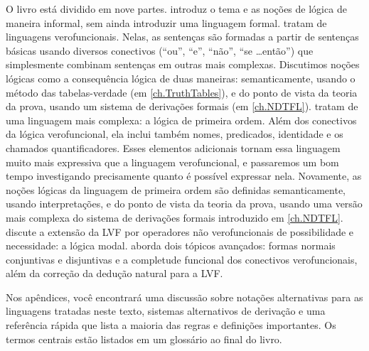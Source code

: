 O livro está dividido em nove partes.  introduz o tema e as noções de lógica de maneira informal, sem ainda introduzir uma linguagem formal.  tratam de linguagens verofuncionais. Nelas, as sentenças são formadas a partir de sentenças básicas usando diversos conectivos (\textquotedblleft ou\textquotedblright, \textquotedblleft e\textquotedblright, \textquotedblleft não\textquotedblright, \textquotedblleft se \dots então\textquotedblright) que simplesmente combinam sentenças em outras mais complexas. Discutimos noções lógicas como a consequência lógica de duas maneiras: semanticamente, usando o método das tabelas-verdade (em \cref{ch.TruthTables}), e do ponto de vista da teoria da prova, usando um sistema de derivações formais (em \cref{ch.NDTFL}).  tratam de uma linguagem mais complexa: a lógica de primeira ordem. Além dos conectivos da lógica verofuncional, ela inclui também nomes, predicados, identidade e os chamados quantificadores. Esses elementos adicionais tornam essa linguagem muito mais expressiva que a linguagem verofuncional, e passaremos um bom tempo investigando precisamente quanto é possível expressar nela. Novamente, as noções lógicas da linguagem de primeira ordem são definidas semanticamente, usando interpretações, e do ponto de vista da teoria da prova, usando uma versão mais complexa do sistema de derivações formais introduzido em \cref{ch.NDTFL}.  discute a extensão da LVF por operadores não verofuncionais de possibilidade e necessidade: a lógica modal.  aborda dois tópicos avançados: formas normais conjuntivas e disjuntivas e a completude funcional dos conectivos verofuncionais, além da correção da dedução natural para a LVF.

Nos apêndices, você encontrará uma discussão sobre notações alternativas para as linguagens tratadas neste texto, sistemas alternativos de derivação e uma referência rápida que lista a maioria das regras e definições importantes. Os termos centrais estão listados em um glossário ao final do livro.


